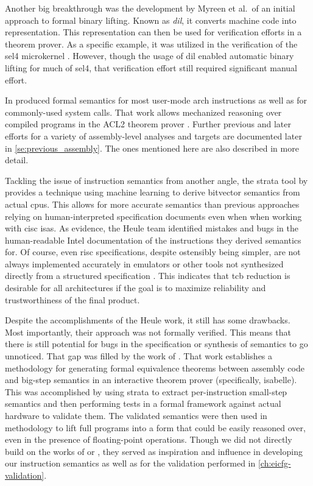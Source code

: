 Another big breakthrough was the development by Myreen et al.\ of an initial approach to formal binary lifting.
Known as \emph{\ac{dil}}, it converts machine code into  representation.
This representation can then be used for verification efforts in a theorem prover.
As a specific example, it was utilized in the verification of the \gls{sel4} microkernel \autocite{klein2009sel4,klein2014comprehensive,sel4}.
However, though the usage of \ac{dil} enabled automatic binary lifting for much of \gls{sel4}, that verification effort still required significant manual effort.

In \textcite{goel2014syscalls,goelphd} produced formal semantics for most user-mode \gls{arch} instructions as well as for commonly-used system calls.
That work allows mechanized reasoning over compiled programs in the ACL2 theorem prover \autocite{ACL2}.
Further previous and later efforts for a variety of assembly-level analyses and targets are documented later in \cref{se:previous_assembly}.
The ones mentioned here are also described in more detail.

Tackling the issue of instruction semantics from another angle, the \gls{strata} tool by \textcite{heule2016stratified} provides a technique using machine learning to derive bitvector semantics from actual \acp{cpu}.
This allows for more accurate semantics than previous approaches relying on human-interpreted specification documents even when when working with \ac{cisc} \acp{isa}.
As evidence, the Heule team identified mistakes and bugs in the human-readable Intel documentation of the instructions they derived semantics for.
Of course, even \ac{risc} specifications, despite ostensibly being simpler, are not always implemented accurately in emulators or other tools not synthesized directly from a structured specification \autocite{jiang2022examiner}.
This indicates that \ac{tcb} reduction is desirable for all architectures if the goal is to maximize reliability and trustworthiness of the final product.

Despite the accomplishments of the Heule work, it still has some drawbacks. Most importantly, their approach was not formally verified.
This means that there is still potential for bugs in the specification or synthesis of semantics to go unnoticed.
That gap was filled by the work of \textcite{roessle2019verified}.
That work establishes a methodology for generating formal equivalence theorems between assembly code and big-step semantics in an interactive theorem prover (specifically, \gls{isabelle}).
This was accomplished by using \gls{strata} to extract per-instruction small-step semantics and then performing tests in a formal framework against actual hardware to validate them.
The validated semantics were then used in  methodology to lift full programs into a form that could be easily reasoned over, even in the presence of floating-point operations.
Though we did not directly build on the works of \textcite{heule2016stratified} or \textcite{roessle2019verified}, they served as inspiration and influence in developing our instruction semantics as well as for the validation performed in \cref{ch:eicfg-validation}.

